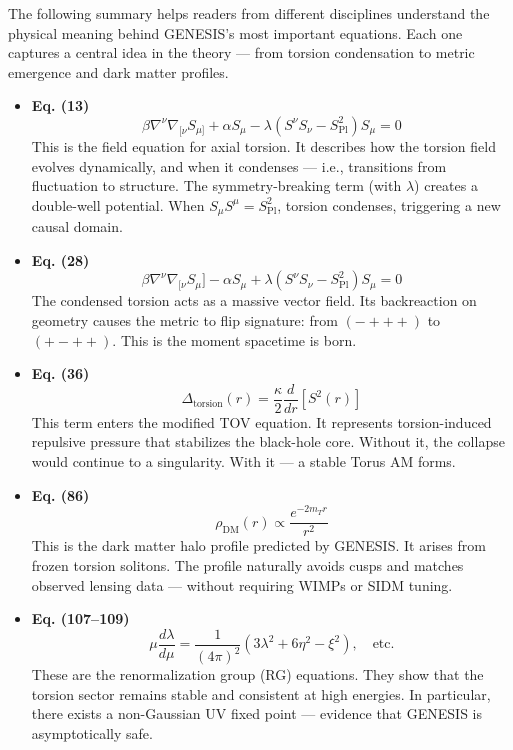 \documentclass{article}
\begin{document}
\vspace{1em}
\begin{tcolorbox}[colback=gray!3, colframe=black, title=What the Core Equations Actually Mean]

\noindent The following summary helps readers from different disciplines understand the physical meaning behind GENESIS’s most important equations. Each one captures a central idea in the theory — from torsion condensation to metric emergence and dark matter profiles.

\begin{itemize}
  \item \textbf{Eq. (13)}  
  \[
  \beta \nabla^\nu \nabla_{[\nu} S_{\mu]} + \alpha S_\mu - \lambda \left( S^\nu S_\nu - S_{\mathrm{Pl}}^2 \right) S_\mu = 0
  \]  
  This is the field equation for axial torsion. It describes how the torsion field evolves dynamically, and when it condenses — i.e., transitions from fluctuation to structure. The symmetry-breaking term (with \(\lambda\)) creates a double-well potential. When \(S_\mu S^\mu = S_{\mathrm{Pl}}^2\), torsion condenses, triggering a new causal domain.

  \item \textbf{Eq. (28)}  
  \[
  \beta \nabla^\nu \nabla_{[\nu} S_\mu] - \alpha S_\mu + \lambda (S^\nu S_\nu - S_{\mathrm{Pl}}^2) S_\mu = 0
  \]  
  The condensed torsion acts as a massive vector field. Its backreaction on geometry causes the metric to flip signature: from \((- + + +)\) to \((+ - + +)\). This is the moment spacetime is born.

  \item \textbf{Eq. (36)}  
  \[
  \Delta_{\text{torsion}}(r) = \frac{\kappa}{2} \frac{d}{dr} \left[ S^2(r) \right]
  \]  
  This term enters the modified TOV equation. It represents torsion-induced repulsive pressure that stabilizes the black-hole core. Without it, the collapse would continue to a singularity. With it — a stable Torus AM forms.

  \item \textbf{Eq. (86)}  
  \[
  \rho_{\mathrm{DM}}(r) \propto \frac{e^{-2 m_T r}}{r^2}
  \]  
  This is the dark matter halo profile predicted by GENESIS. It arises from frozen torsion solitons. The profile naturally avoids cusps and matches observed lensing data — without requiring WIMPs or SIDM tuning.

  \item \textbf{Eq. (107–109)}  
  \[
  \mu \frac{d\lambda}{d\mu} = \frac{1}{(4\pi)^2} \left( 3\lambda^2 + 6\eta^2 - \xi^2 \right), \quad \text{etc.}
  \]  
  These are the renormalization group (RG) equations. They show that the torsion sector remains stable and consistent at high energies. In particular, there exists a non-Gaussian UV fixed point — evidence that GENESIS is asymptotically safe.


\end{itemize}
\end{tcolorbox}
\end{document}
